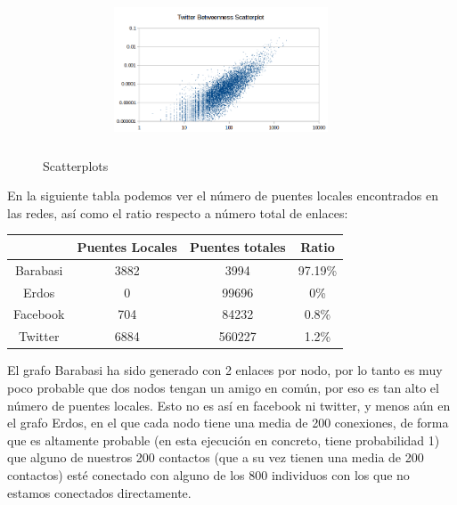 \documentclass[spanish]{assignment}
\begin{document}
\begin{figure}[ht!]
\begin{subfigure}[t!]{0.5\textwidth}
\begin{subfigure}[t!]{\textwidth}
				\end{subfigure}
				\begin{subfigure}[t!]{\textwidth}
					\centering
					\includegraphics[width=180pt, height=120pt]{img/twitter_b_s.png}
				\end{subfigure}
			\end{subfigure}
			\caption{%
				Scatterplots
			}%
			\label{scatters}
		\end{figure}
	
	En la siguiente tabla podemos ver el número de puentes locales encontrados en las redes, así como el ratio respecto a número total de enlaces:

	\begin{center}
		\begin{tabular}{|c|c|c|c|}
			\hline
			&\textbf{Puentes Locales} & \textbf{Puentes totales} & \textbf{Ratio} \\ 
			\hline
			Barabasi & 3882 & 3994 & 97.19\% \\
			\hline
			Erdos & 0 & 99696 & 0\% \\
			\hline
			Facebook & 704 & 84232 & 0.8\% \\
			\hline
			Twitter & 6884 & 560227 & 1.2\% \\
			\hline
		\end{tabular}
	\end{center}	
	
	El grafo Barabasi ha sido generado con 2 enlaces por nodo, por lo tanto es muy poco probable que dos nodos tengan un amigo en común, por eso es tan alto
	el número de puentes locales.
	Esto no es así en facebook ni twitter, y menos aún en el grafo Erdos, en el que cada nodo tiene una media de 200 conexiones, de forma que es altamente probable
	(en esta ejecución en concreto, tiene probabilidad 1) que alguno de nuestros 200 contactos (que a su vez tienen una media de 200 contactos) esté conectado con alguno de los 800 individuos con los que no estamos conectados directamente.\\
	
\end{document}
